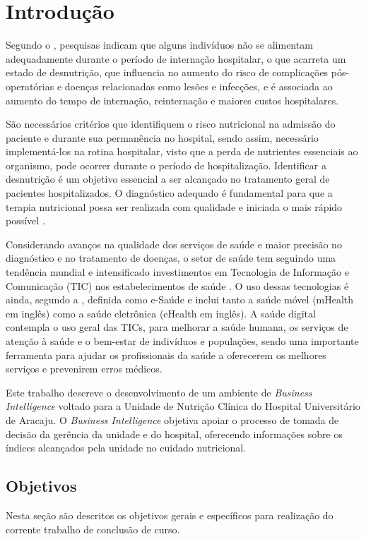 \chapter{Introdução}
Segundo o , pesquisas indicam que alguns indivíduos não se alimentam adequadamente durante o período de internação hospitalar, o que acarreta um estado de desnutrição, que influencia no aumento do risco de complicações pós-operatórias e doenças relacionadas como lesões e infecções, e é associada ao aumento do tempo de internação, reinternação e maiores custos hospitalares.

São necessários critérios que identifiquem o risco nutricional na admissão do paciente e durante sua permanência no hospital, sendo assim, necessário implementá-los na rotina hospitalar, visto que a perda de nutrientes essenciais ao organismo, pode ocorrer durante o período de hospitalização. Identificar a desnutrição é um objetivo essencial a ser alcançado no tratamento geral de pacientes hospitalizados. O diagnóstico adequado é fundamental para que a terapia nutricional possa ser realizada com qualidade e iniciada o mais rápido possível \cite{keller2014}.

Considerando avanços na qualidade dos serviços de saúde e maior precisão no diagnóstico e no tratamento de doenças, o setor de saúde tem seguindo uma tendência mundial e intensificado investimentos em Tecnologia de Informação e Comunicação (TIC) nos estabelecimentos de saúde \cite{saudedigital2019}. O uso dessas tecnologias é ainda, segundo a , definida como e-Saúde e inclui tanto a saúde móvel (mHealth em inglês) como a saúde eletrônica (eHealth em inglês). A saúde digital contempla o uso geral das TICs, para melhorar a saúde humana, os serviços de atenção à saúde e o bem-estar de indivíduos e populações, sendo uma importante ferramenta para ajudar os profissionais da saúde a oferecerem os melhores serviços e prevenirem erros médicos.

Este trabalho descreve o desenvolvimento de um ambiente de \textit{Business Intelligence} voltado para a Unidade de Nutrição Clínica do Hospital Universitário de Aracaju. O \textit{Business Intelligence} objetiva apoiar o processo de tomada de decisão da gerência da unidade e do hospital, oferecendo informações sobre os índices alcançados pela unidade no cuidado nutricional.  


\section{Objetivos}\label{sec-divisoes}
Nesta seção são descritos os objetivos gerais e específicos para realização do corrente trabalho de conclusão de curso.

